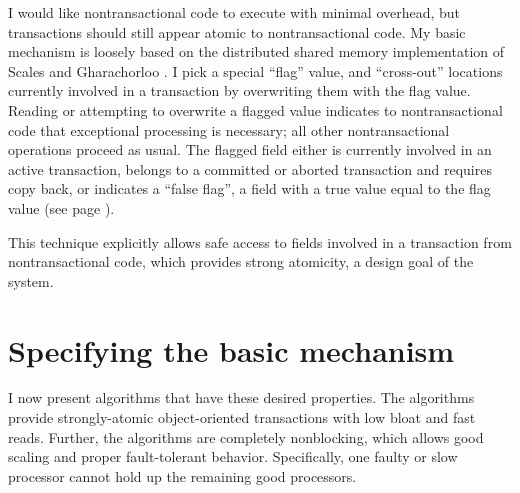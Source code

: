 I would like nontransactional code to execute with minimal overhead,
but transactions should still appear atomic to nontransactional
code.  My basic mechanism is loosely based on the
distributed shared memory implementation of Scales and Gharachorloo
\cite{ScalesGh97}.  I pick a special ``flag'' value, and
``cross-out'' locations currently involved in a transaction by
overwriting them with the flag value.  Reading or attempting to
overwrite a flagged value indicates to nontransactional code
that exceptional processing is necessary; all other nontransactional
operations proceed as usual.  The flagged field either is currently
involved in an active transaction, belongs to a committed or aborted
transaction and requires copy back, or indicates a ``false flag'', a
field with a true value equal to the flag value (see
page \pageref{pg:falseflag}).

This technique explicitly allows safe access to fields
involved in a transaction from nontransactional code, which provides
strong atomicity, a
design goal of the system.

\section{Specifying the basic mechanism}
I now present algorithms that have these desired properties.
The \apex algorithms provide strongly-atomic object-oriented
transactions with low bloat and fast reads.  Further, the \apex
algorithms are completely nonblocking, which allows good
scaling and proper fault-tolerant behavior.  Specifically, one faulty or slow
processor cannot hold up the remaining good processors.

